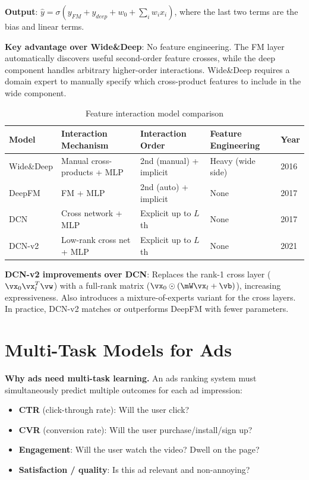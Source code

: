 \textbf{Output}: $\hat{y} = \sigma(y_{FM} + y_{deep} + w_0 + \sum_i w_i x_i)$, where the last two terms are the bias and linear terms.

\textbf{Key advantage over Wide\&Deep}: No feature engineering. The FM layer automatically discovers useful second-order feature crosses, while the deep component handles arbitrary higher-order interactions. Wide\&Deep requires a domain expert to manually specify which cross-product features to include in the wide component.

\begin{table}[H]
\centering
\caption{Feature interaction model comparison}
\begin{tabularx}{\textwidth}{lXXXl}
\toprule
\textbf{Model} & \textbf{Interaction Mechanism} & \textbf{Interaction Order} & \textbf{Feature Engineering} & \textbf{Year} \\
\midrule
Wide\&Deep & Manual cross-products + MLP & 2nd (manual) + implicit & Heavy (wide side) & 2016 \\
DeepFM & FM + MLP & 2nd (auto) + implicit & None & 2017 \\
DCN & Cross network + MLP & Explicit up to $L$th & None & 2017 \\
DCN-v2 & Low-rank cross net + MLP & Explicit up to $L$th & None & 2021 \\
\bottomrule
\end{tabularx}
\end{table}

\textbf{DCN-v2 improvements over DCN}: Replaces the rank-1 cross layer ($\vx_0 \vx_l^T \vw$) with a full-rank matrix ($\vx_0 \odot (\mW \vx_l + \vb)$), increasing expressiveness. Also introduces a mixture-of-experts variant for the cross layers. In practice, DCN-v2 matches or outperforms DeepFM with fewer parameters.

\section{Multi-Task Models for Ads}
\label{sec:multitask_ads}

\textbf{Why ads need multi-task learning.} An ads ranking system must simultaneously predict multiple outcomes for each ad impression:
\begin{itemize}
    \item \textbf{CTR} (click-through rate): Will the user click?
    \item \textbf{CVR} (conversion rate): Will the user purchase/install/sign up?
    \item \textbf{Engagement}: Will the user watch the video? Dwell on the page?
    \item \textbf{Satisfaction / quality}: Is this ad relevant and non-annoying?
\end{itemize}

